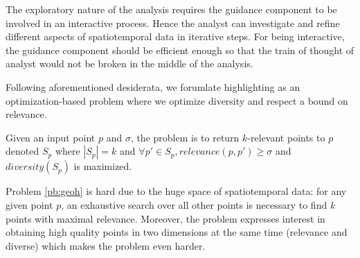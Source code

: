  The exploratory nature of the analysis requires the guidance component to be involved in an interactive process. Hence the analyst can investigate and refine different aspects of spatiotemporal data in iterative steps. For being interactive, the guidance component should be efficient enough so that the train of thought of analyst would not be broken in the middle of the analysis.

\vspace{5pt}
Following aforementioned desiderata, we forumlate highlighting as an optimization-based problem where we optimize diversity and respect a bound on relevance.

\begin{problem}[\pb]
\label{pb:geoh}
Given an input point $p$ and $\sigma$, the problem is to return $k$-relevant points to $p$ denoted $S_p$ where $|S_p| = k$ and $\forall p' \in S_p, \mathit{relevance}(p,p') \geq \sigma$ and $\mathit{diversity}(S_p)$ is maximized.
\end{problem}

Problem \ref{pb:geoh} is hard due to the huge space of spatiotemporal data: for any given point $p$, an exhaustive search over all other points is necessary to find $k$ points with maximal relevance. Moreover, the problem expresses interest in obtaining high quality points in two dimensions at the same time (relevance and diverse) which makes the problem even harder.

